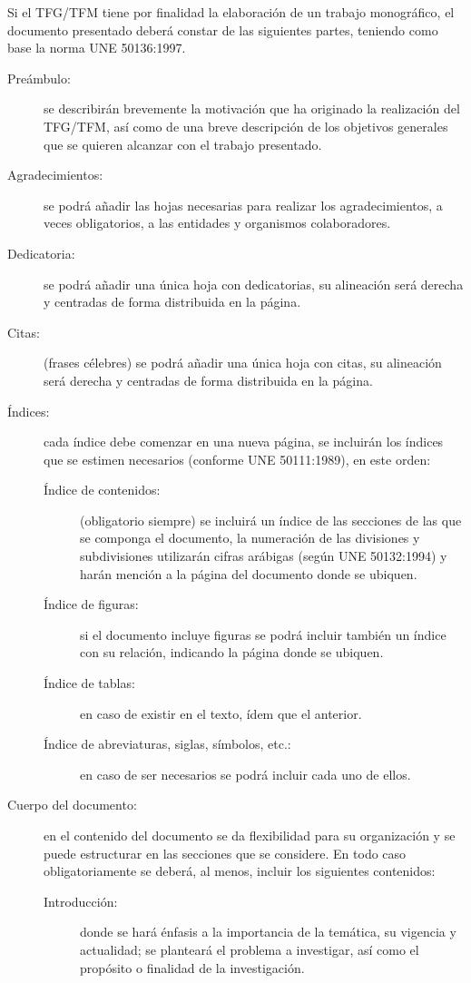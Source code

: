 Si el TFG/TFM tiene por finalidad la elaboración de un trabajo monográfico, el 
documento presentado deberá constar de las siguientes partes, teniendo como base la 
norma UNE 50136:1997.

\begin{description}
\item[Preámbulo:] se describirán brevemente la motivación que ha originado la realización del TFG/TFM, así como de una breve descripción de los objetivos generales que se quieren alcanzar con el trabajo presentado.
\item[Agradecimientos:] se podrá añadir las hojas necesarias para realizar los agradecimientos, a veces obligatorios, a las entidades y organismos colaboradores.
\item[Dedicatoria:] se podrá añadir una única hoja con dedicatorias, su alineación será derecha y centradas de forma distribuida en la página.
\item[Citas:] (frases célebres) se podrá añadir una única hoja con citas, su alineación será derecha y centradas de forma distribuida en la página.
\item[Índices:] cada índice debe comenzar en una nueva página, se incluirán los índices que se estimen necesarios (conforme UNE 50111:1989), en este orden:
\begin{description}
\item[Índice de contenidos:] (obligatorio siempre) se incluirá un índice de las secciones de las que se componga el documento, la numeración de las 
divisiones y subdivisiones utilizarán cifras arábigas (según UNE 50132:1994) y harán mención a la página del documento donde se ubiquen.
\item[Índice de figuras:] si el documento incluye figuras se podrá incluir también un índice con su relación, indicando la página donde se ubiquen.
\item[Índice de tablas:] en caso de existir en el texto, ídem que el anterior.
\item[Índice de abreviaturas, siglas, símbolos, etc.:] en caso de ser necesarios se podrá incluir cada uno de ellos.
\end{description}
\item[Cuerpo del documento:] en el contenido del documento se da flexibilidad para su organización y se puede estructurar en las secciones que se considere. En todo caso obligatoriamente se deberá, al menos, incluir los siguientes contenidos:
\begin{description}
\item[Introducción:] donde se hará énfasis a la importancia de la temática, su vigencia y actualidad; se planteará el problema a investigar, así como el propósito o finalidad de la investigación.

\end{description}
\end{description}
